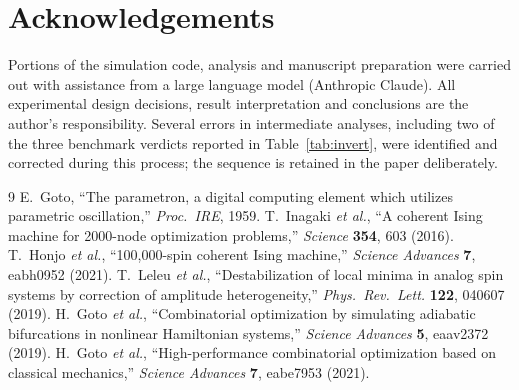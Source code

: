\documentclass[11pt]{article}
\begin{document}
\section*{Acknowledgements}
Portions of the simulation code, analysis and manuscript preparation were carried
out with assistance from a large language model (Anthropic Claude). All
experimental design decisions, result interpretation and conclusions are the
author's responsibility. Several errors in intermediate analyses, including two
of the three benchmark verdicts reported in Table~\ref{tab:invert}, were
identified and corrected during this process; the sequence is retained in the
paper deliberately.

\begin{thebibliography}{9}
 E.~Goto, ``The parametron, a digital computing element which
utilizes parametric oscillation,'' \emph{Proc.\ IRE}, 1959.
 T.~Inagaki \emph{et al.}, ``A coherent Ising machine for
2000-node optimization problems,'' \emph{Science} \textbf{354}, 603 (2016).
 T.~Honjo \emph{et al.}, ``100,000-spin coherent Ising
machine,'' \emph{Science Advances} \textbf{7}, eabh0952 (2021).
 T.~Leleu \emph{et al.}, ``Destabilization of local minima in
analog spin systems by correction of amplitude heterogeneity,''
\emph{Phys.\ Rev.\ Lett.} \textbf{122}, 040607 (2019).
 H.~Goto \emph{et al.}, ``Combinatorial optimization by
simulating adiabatic bifurcations in nonlinear Hamiltonian systems,''
\emph{Science Advances} \textbf{5}, eaav2372 (2019).
 H.~Goto \emph{et al.}, ``High-performance combinatorial
optimization based on classical mechanics,'' \emph{Science Advances} \textbf{7},
eabe7953 (2021).
\end{thebibliography}
\end{document}
